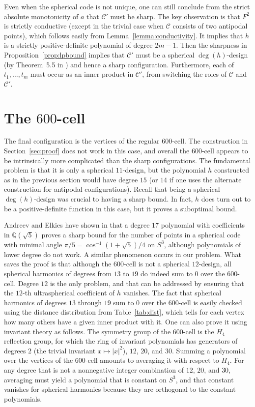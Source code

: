 \documentclass{jams-l}
\theoremstyle{plain}
\numberwithin{theorem}{section}
\theoremstyle{definition}
\numberwithin{equation}{section}
\newcommand{\Q}{{\mathbb Q}}
\newcommand{\CodeS}{\mathcal{C}}
\newcommand{\CodeT}{\mathcal{C}'}
\begin{document}
Even when the spherical code is not unique, one can still conclude
from the strict absolute monotonicity of $a$ that $\CodeT$ must be
sharp.  The key observation is that $F^2$ is strictly conductive
(except in the trivial case when $\CodeS$ consists of two
antipodal points), which follows easily from
Lemma~\ref{lemma:conductivity}. It implies that $h$ is a strictly
positive-definite polynomial of degree $2m-1$. Then the sharpness
in Proposition~\ref{prop:lpbound} implies that $\CodeT$ must be a
spherical $\deg(h)$-design (by Theorem~5.5 in \cite{DGS}) and
hence a sharp configuration.  Furthermore, each of $t_1,\dots,t_m$
must occur as an inner product in $\CodeT$, from switching the
roles of $\CodeS$ and $\CodeT$.

\section{The $600$-cell}
\label{sec:600}

The final configuration is the vertices of the regular $600$-cell.
The construction in Section~\ref{sec:proof} does not work in this
case, and overall the $600$-cell appears to be intrinsically more
complicated than the sharp configurations.  The fundamental
problem is that it is only a spherical $11$-design, but the
polynomial $h$ constructed as in the previous section would have
degree $15$ (or $14$ if one uses the alternate construction for
antipodal configurations). Recall that being a spherical
$\deg(h)$-design was crucial to having a sharp bound. In fact, $h$
does turn out to be a positive-definite function in this case, but
it proves a suboptimal bound.

Andreev and Elkies have shown in \cite{A3,E} that a degree $17$
polynomial with coefficients in $\Q(\sqrt{5})$ proves a sharp
bound for the number of points in a spherical code with minimal
angle $\pi/5 = \cos^{-1} (1+\sqrt{5})/4$ on $S^3$, although
polynomials of lower degree do not work. A similar phenomenon
occurs in our problem. What saves the proof is that although the
$600$-cell is not a spherical $12$-design, all spherical harmonics
of degrees from $13$ to $19$ do indeed sum to $0$ over the
$600$-cell.  Degree $12$ is the only problem, and that can be
addressed by ensuring that the $12$-th ultraspherical coefficient
of $h$ vanishes. The fact that spherical harmonics of degrees $13$
through $19$ sum to $0$ over the $600$-cell is easily checked
using the distance distribution from Table~\ref{tab:dist}, which
tells for each vertex how many others have a given inner product
with it. One can also prove it using invariant theory as follows.
The symmetry group of the $600$-cell is the $H_4$ reflection
group, for which the ring of invariant polynomials has generators
of degrees $2$ (the trivial invariant $x \mapsto |x|^2$), $12$,
$20$, and $30$. Summing a polynomial over the vertices of the
$600$-cell amounts to averaging it with respect to $H_4$.  For any
degree that is not a nonnegative integer combination of $12$,
$20$, and $30$, averaging must yield a polynomial that is constant
on $S^3$, and that constant vanishes for spherical harmonics
because they are orthogonal to the constant polynomials.
\end{document}
